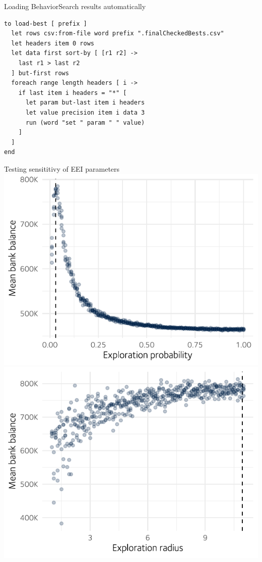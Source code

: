\documentclass[table, 14pt, aspectratio=169]{beamer}
\begin{document}
\begin{frame}[fragile=singleslide]{Loading BehaviorSearch results automatically}
  \begin{adjustbox}{max height=0.8\textheight, max width = \linewidth}
    \begin{verbatim}  
to load-best [ prefix ]
  let rows csv:from-file word prefix ".finalCheckedBests.csv"
  let headers item 0 rows
  let data first sort-by [ [r1 r2] -> 
    last r1 > last r2 
  ] but-first rows
  foreach range length headers [ i ->
    if last item i headers = "*" [
      let param but-last item i headers
      let value precision item i data 3
      run (word "set " param " " value)
    ]
  ]
end
    \end{verbatim}
  \end{adjustbox}
\end{frame}

\begin{frame}{Testing sensititivy of EEI parameters}
  \includegraphics[width=0.49\linewidth]{images/exploration_prob.pdf}
  \hfill
  \includegraphics[width=0.49\linewidth]{images/exploration_radius.pdf}
\end{frame}
\end{document}

